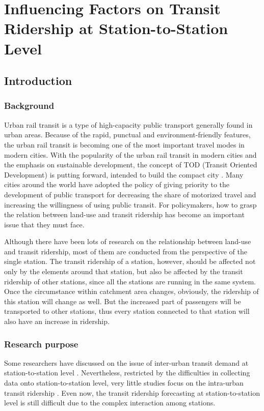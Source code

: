 \chapter{Influencing Factors on Transit Ridership at Station-to-Station Level}

\section{Introduction}
\subsection{Background}
%
Urban rail transit is a type of high-capacity public transport generally found in urban areas. Because of the rapid, punctual and environment-friendly features, the urban rail transit is becoming one of the most important travel modes in modern cities. With the popularity of the urban rail transit in modern cities and the emphasis on sustainable development, the concept of TOD (Transit Oriented Development) is putting forward, intended to build the compact city \cite{calthorpe1993next}. Many cities around the world have adopted the policy of giving priority to the development of public transport for decreasing the share of motorized travel and increasing the willingness of using public transit. For policymakers, how to grasp the relation between land-use and transit ridership has become an important issue that they must face.

%
Although there have been lots of research on the relationship between land-use and transit ridership, most of them are conducted from the perspective of the single station. The transit ridership of a station, however, should be affected not only by the elements around that station, but also be affected by the transit ridership of other stations, since all the stations are running in the same system.  Once the circumstance within catchment area changes, obviously, the ridership of this station will change as well. But the increased part of passengers will be transported to other stations, thus every station connected to that station will also have an increase in ridership. 

\subsection{Research purpose}
%
Some researchers have discussed on the issue of inter-urban transit demand at station-to-station level \cite{wardman1997inter,jones1983demand}. Nevertheless, restricted by the difficulties in collecting data onto station-to-station level, very little studies focus on the intra-urban transit ridership \cite{choi2012analysis}. Even now, the transit ridership forecasting at station-to-station level is still difficult due to the complex interaction among stations. 

